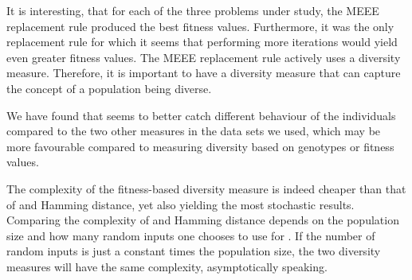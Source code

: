 It is interesting, that for each of the three problems under study, the MEEE replacement rule produced the best fitness values. Furthermore, it was the only replacement rule for which it seems that performing more iterations would yield even greater fitness values. 
The MEEE replacement rule actively uses a diversity measure.
Therefore, it is important to have a diversity measure that can capture the concept of a population being diverse.

We have found that \dia{} seems to better catch different behaviour of the individuals compared to the two other measures in the data sets we used, which may be more favourable compared to measuring diversity based on genotypes or fitness values.

The complexity of the fitness-based diversity measure is indeed cheaper than that of \dia{} and Hamming distance, yet also yielding the most stochastic results. Comparing the complexity of \dia{} and Hamming distance depends on the population size and how many random inputs one chooses to use for \dia{}. If the number of random inputs is just a constant times the population size, the two diversity measures will have the same complexity, asymptotically speaking.
